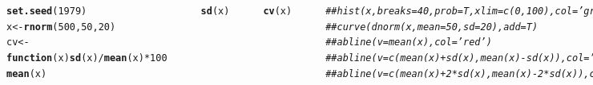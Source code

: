\documentclass{beamer}\usepackage[]{graphicx}\usepackage[]{color}
\makeatletter
\newcommand{\hlnum}[1]{\textcolor[rgb]{0.686,0.059,0.569}{#1}}%
\newcommand{\hlcom}[1]{\textcolor[rgb]{0.678,0.584,0.686}{\textit{#1}}}%
\newcommand{\hlopt}[1]{\textcolor[rgb]{0,0,0}{#1}}%
\newcommand{\hlstd}[1]{\textcolor[rgb]{0.345,0.345,0.345}{#1}}%
\newcommand{\hlkwa}[1]{\textcolor[rgb]{0.161,0.373,0.58}{\textbf{#1}}}%
\newcommand{\hlkwb}[1]{\textcolor[rgb]{0.69,0.353,0.396}{#1}}%
\newcommand{\hlkwc}[1]{\textcolor[rgb]{0.333,0.667,0.333}{#1}}%
\newcommand{\hlkwd}[1]{\textcolor[rgb]{0.737,0.353,0.396}{\textbf{#1}}}%
\newenvironment{kframe}{%
 \def\at@end@of@kframe{}%
 \ifinner\ifhmode%
  \def\at@end@of@kframe{\end{minipage}}%
  \begin{minipage}{\columnwidth}%
 \fi\fi%
 \def\FrameCommand##1{\hskip\@totalleftmargin \hskip-\fboxsep
 \colorbox{shadecolor}{##1}\hskip-\fboxsep
     \hskip-\linewidth \hskip-\@totalleftmargin \hskip\columnwidth}%
 \MakeFramed {\advance\hsize-\width
   \@totalleftmargin\z@ \linewidth\hsize
   \@setminipage}}%
 {\par\unskip\endMakeFramed%
 \at@end@of@kframe}
\newenvironment{knitrout}{}{} %
\renewenvironment{knitrout}{\setlength{\topsep}{0mm}}{}
\makeatother
\begin{document}
\begin{frame}[fragile]%

\begin{columns}[c]


\begin{knitrout}\tiny
{}\color{fgcolor}\begin{kframe}
\begin{alltt}
\hlkwd{set.seed}\hlstd{(}\hlnum{1979}\hlstd{)}
\hlstd{x} \hlkwb{<-} \hlkwd{rnorm}\hlstd{(}\hlnum{500}\hlstd{,}\hlnum{50}\hlstd{,}\hlnum{20}\hlstd{)}
\hlstd{cv} \hlkwb{<-} \hlkwa{function}\hlstd{(}\hlkwc{x}\hlstd{)} \hlkwd{sd}\hlstd{(x)}\hlopt{/}\hlkwd{mean}\hlstd{(x)} \hlopt{*} \hlnum{100}
\hlkwd{mean}\hlstd{(x)}
\end{alltt}
\begin{verbatim}
## [1] 50.7281
\end{verbatim}
\begin{alltt}
\hlkwd{sd}\hlstd{(x)}
\end{alltt}
\begin{verbatim}
## [1] 19.75503
\end{verbatim}
\begin{alltt}
\hlkwd{cv}\hlstd{(x)}
\end{alltt}
\begin{verbatim}
## [1] 38.94297
\end{verbatim}
\begin{alltt}
\hlcom{## hist(x,breaks=40,prob=T,xlim=c(0,100),col='gray70')}
\hlcom{## curve(dnorm(x,mean=50, sd=20), add=T)}
\hlcom{## abline(v=mean(x),col='red')}
\hlcom{## abline(v=c(mean(x)+sd(x),mean(x)-sd(x)),col='blue')}
\hlcom{## abline(v=c(mean(x)+2*sd(x),mean(x)-2*sd(x)),col='purple')}
\end{alltt}
\end{kframe}
\end{knitrout}


\end{columns}
\end{frame}
\end{document}
